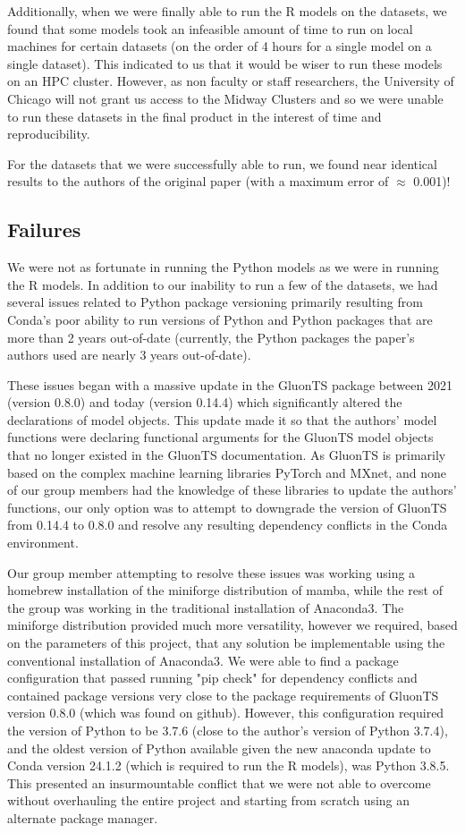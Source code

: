 \documentclass{article}
\begin{document}
Additionally, when we were finally able to run the R models on the datasets, we found that some models took an infeasible amount of time to run on local machines for certain datasets (on the order of 4 hours for a single model on a single dataset). This indicated to us that it would be wiser to run these models on an HPC cluster. However, as non faculty or staff researchers, the University of Chicago will not grant us access to the Midway Clusters and so we were unable to run these datasets in the final product in the interest of time and reproducibility. 

For the datasets that we were successfully able to run, we found near identical results to the authors of the original paper (with a maximum error of $\approx$ 0.001)!

\subsection{Failures}
We were not as fortunate in running the Python models as we were in running the R models. In addition to our inability to run a few of the datasets, we had several issues related to Python package versioning primarily resulting from Conda's poor ability to run versions of Python and Python packages that are more than 2 years out-of-date (currently, the Python packages the paper's authors used are nearly 3 years out-of-date).

These issues began with a massive update in the GluonTS package between 2021 (version 0.8.0) and today (version 0.14.4) which significantly altered the declarations of model objects. This update made it so that the authors' model functions were declaring functional arguments for the GluonTS model objects that no longer existed in the GluonTS documentation. As GluonTS is primarily based on the complex machine learning libraries PyTorch and MXnet, and none of our group members had the knowledge of these libraries to update the authors' functions, our only option was to attempt to downgrade the version of GluonTS from 0.14.4 to 0.8.0 and resolve any resulting dependency conflicts in the Conda environment. 

Our group member attempting to resolve these issues was working using a homebrew installation of the miniforge distribution of mamba, while the rest of the group was working in the traditional installation of Anaconda3. The miniforge distribution provided much more versatility, however we required, based on the parameters of this project, that any solution be implementable using the conventional installation of Anaconda3. We were able to find a package configuration that passed running "pip check" for dependency conflicts and contained package versions very close to the package requirements of GluonTS version 0.8.0 (which was found on github). However, this configuration required the version of Python to be 3.7.6 (close to the author's version of Python 3.7.4), and the oldest version of Python available given the new anaconda update to Conda version 24.1.2 (which is required to run the R models), was Python 3.8.5. This presented an insurmountable conflict that we were not able to overcome without overhauling the entire project and starting from scratch using an alternate package manager.
\end{document}
